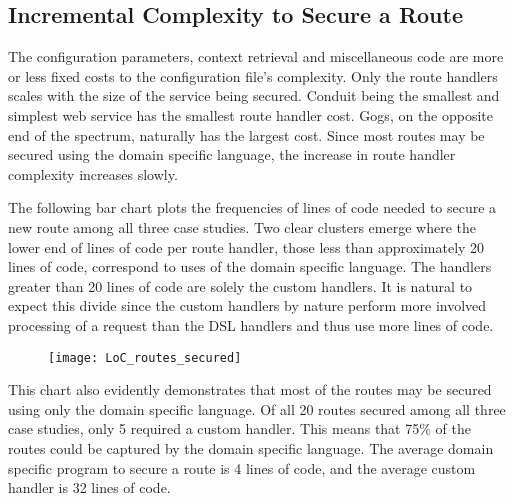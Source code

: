 \subsection{Incremental Complexity to Secure a Route}

The configuration parameters, context retrieval and miscellaneous code are more or less fixed costs to the configuration file's complexity. Only the route handlers scales with the size of the service being secured. Conduit being the smallest and simplest web service has the smallest route handler cost. Gogs, on the opposite end of the spectrum, naturally has the largest cost. Since most routes may be secured using the domain specific language, the increase in route handler complexity increases slowly.

The following bar chart plots the frequencies of lines of code needed to secure a new route among all three case studies. Two clear clusters emerge where the lower end of lines of code per route handler, those less than approximately 20 lines of code, correspond to uses of the domain specific language. The handlers greater than 20 lines of code are solely the custom handlers. It is natural to expect this divide since the custom handlers by nature perform more involved processing of a request than the DSL handlers and thus use more lines of code.

\begin{figure}[h]
  \centering
  \texttt{[image: LoC\_routes\_secured]}
\end{figure}

This chart also evidently demonstrates that most of the routes may be secured using only the domain specific language. Of all 20 routes secured among all three case studies, only 5 required a custom handler. This means that 75\% of the routes could be captured by the domain specific language. The average domain specific program to secure a route is 4 lines of code, and the average custom handler is 32 lines of code.






